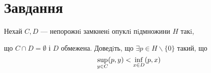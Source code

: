 
\chapter{Завдання \theHchapter}


\begin{tcolorbox}[title=Завдання]
    
    Нехай $C, D$ — непорожнi замкненi опуклi пiдмножини 
    $H$ такi, 
    
    
    що $ C \cap D = \emptyset$ і $D$ обмежена.
    Доведiть, що $ \exists p \in H \backslash \{0\} $
    такий, що
    $$ \displaystyle\sup_{y \in C} (p, y) < \displaystyle\inf_{x \in D} (p, x) $$

    
\end{tcolorbox}

